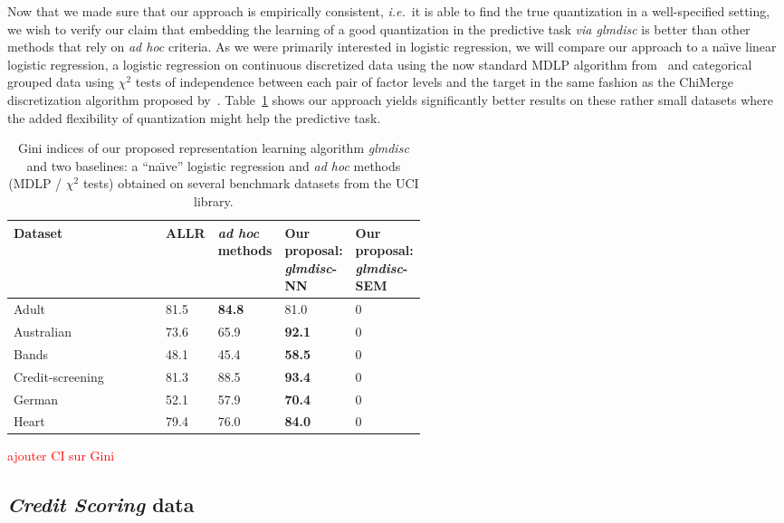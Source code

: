 Now that we made sure that our approach is empirically consistent, \textit{i.e.}\ it is able to find the true quantization in a well-specified setting, we wish to verify our claim that embedding the learning of a good quantization in the predictive task \textit{via glmdisc} is better than other methods that rely on \textit{ad hoc} criteria. As we were primarily interested in logistic regression, we will compare our approach to a na\"{\i}ve linear logistic regression, a logistic regression on continuous discretized data using the now standard MDLP algorithm from~\cite{fayyad1993multi} and categorical grouped data using $\chi^2$ tests of independence between each pair of factor levels and the target in the same fashion as the ChiMerge discretization algorithm proposed by~\cite{kerber1992chimerge}. Table~\ref{tab:banchmark} shows our approach yields significantly better results on these rather small datasets where the added flexibility of quantization might help the predictive task.


\begin{table}
    \centering
\begin{tabular}{lp{0.1\linewidth}p{0.13\linewidth}p{0.15\linewidth}p{0.15\linewidth}}
Dataset & ALLR & \textit{ad hoc} methods & Our proposal: \textit{glmdisc}-NN & Our proposal: \textit{glmdisc}-SEM \\
\hline
Adult & 81.5 & \bf{84.8} & 81.0 & 0 \\
Australian & 73.6 & 65.9 & \bf{92.1} & 0 \\
Bands & 48.1 & 45.4 & \bf{58.5} & 0 \\
Credit-screening & 81.3 & 88.5 & \bf{93.4} & 0 \\
German & 52.1 & 57.9 & \bf{70.4} & 0 \\
Heart & 79.4 & 76.0 & \bf{84.0} & 0
\end{tabular}
    \caption{Gini indices of our proposed representation learning algorithm \textit{glmdisc} and two baselines: a ``na\"{\i}ve'' logistic regression and \textit{ad hoc} methods (MDLP / $\chi^2$ tests) obtained on several benchmark datasets from the UCI library.}
    \label{tab:banchmark}
\end{table}

\textcolor{red}{ajouter CI sur Gini}

\subsection{\textit{Credit Scoring} data}


